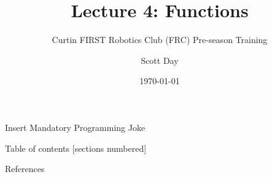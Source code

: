 \documentclass[9pt]{beamer}              %
\title{Lecture 4: Functions}
\subtitle{Curtin FIRST Robotics Club (FRC) Pre-season Training}
\date{\today}
\author{Scott Day}
\institute{Curtin University}
\begin{document}


\maketitle

\begin{frame}[fragile]{Insert Mandatory Programming Joke}
    \begin{center}
    \end{center}
\end{frame}

\begin{frame}{Table of contents}
    [sections numbered]
    \tableofcontents[hideallsubsections]
\end{frame}














\begin{frame}[allowframebreaks]{References}
    
    
\end{frame}

\end{document}
